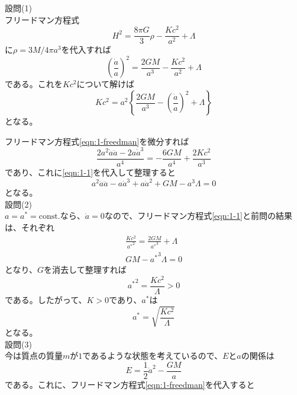 \documentclass[unicode,a4paper,10pt]{ltjsarticle}
\begin{document}
\maketitle

設問(1)\\

フリードマン方程式
\begin{equation}
  H^2
  =
  \frac{8\pi G}{3}\rho
  -
  \frac{Kc^2}{a^2}
  +
  \Lambda
\end{equation}
に$\rho=3M/4\pi a^3$を代入すれば
\begin{equation}
  \left(  
    \frac{\dot{a}}{a}
  \right)^2
  =
  \frac{2GM}{a^3}
  -
  \frac{Kc^2}{a^2}
  +
  \Lambda  
  \label{eqn:1-freedman}
\end{equation}
である。これを$Kc^2$について解けば
\begin{equation}
  Kc^2
  =
  a^2
  \left\{
    \frac{2GM}{a^3}
    -
    \left( \frac{\dot{a}}{a} \right)^2
    +
    \Lambda
  \right\}
  \label{eqn:1-1}
\end{equation}
となる。

フリードマン方程式\eqref{eqn:1-freedman}を微分すれば
\begin{equation}
  \frac{2a^2\dot{a}\ddot{a}-2a\dot{a}^3}{a^4}
  =
  -\frac{6GM}{a^4}+\frac{2Kc^2}{a^3}
\end{equation}
であり、これに\eqref{eqn:1-1}を代入して整理すると
\begin{equation}
  a^2\dot{a}\ddot{a}
  -
  a\dot{a}^3
  +
  a\dot{a}^2
  +
  GM
  -
  a^3\Lambda
  =
  0
\end{equation}
となる。\\


設問(2)\\

$a=a^{\ast}=\text{const.}$なら、$\dot{a}=0$なので、フリードマン方程式\eqref{eqn:1-1}と前問の結果は、それぞれ
\begin{gather}
  \frac{Kc^2}{{a^{\ast}}^2}
  =
  \frac{2GM}{{a^{\ast}}^3}
  +
  \Lambda
  \\
  GM
  -
  {a^{\ast}}^3\Lambda
  =
  0
\end{gather}
となり、$G$を消去して整理すれば
\begin{equation}
  {a^{\ast}}^2
  =
  \frac{Kc^2}{\Lambda}
  >
  0
\end{equation}
である。したがって、$K>0$であり、$a^{\ast}$は
\begin{equation}
  {a^{\ast}}
  =
  \sqrt{\frac{Kc^2}{\Lambda}}
\end{equation}
となる。\\


設問(3)\\

今は質点の質量$m$が$1$であるような状態を考えているので、$E$と$a$の関係は
\begin{equation}
  E
  =
  \frac{1}{2}\dot{a}^2
  -
  \frac{GM}{a}
\end{equation}
である。これに、フリードマン方程式\eqref{eqn:1-freedman}を代入すると
\begin{equation}
  
\end{equation}
\end{document}
